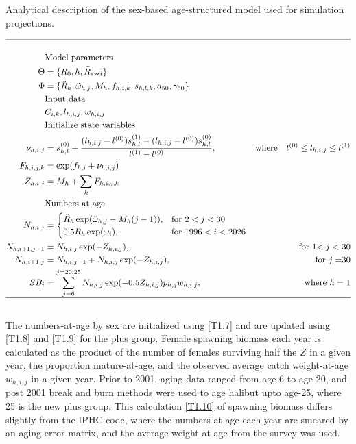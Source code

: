\begin{table}
	\caption{Analytical description of the sex-based age-structured model used for simulation projections.}
	\label{tab:model_description}
	\begin{center}
		\tableEq
		\begin{align}
			\hline \nonumber\\
			&\mbox{Model parameters} \nonumber\\
			\Theta &= \{R_0,h,\bar{R},\omega_{i}\}  \label{T1.1}\\
			\Phi   &= \{\ddot{R}_h,\ddot{\omega}_{h,j},M_h,f_{h,i,k},s_{h,l,k},a_{50},\gamma_{50}\}  \label{T1.2}\\
			&\mbox{Input data} \nonumber\\
			&C_{i,k}, l_{h,i,j},w_{h,i,j} \label{T1.3}\\
			&\mbox{Initialize state variables }\nonumber\\
			\nu_{h,i,j} &= s_{h,l}^{(0)}+ \frac{ (l_{h,i,j}-l^{(0)})s_{h,l}^{(1)} - (l_{h,i,j}-l^{(0)})s_{h,l}^{(0)} }
			{ l^{(1)}-l^{(0)} },& \mbox{where} \quad l^{(0)} \leq l_{h,i,j} \leq l^{(1)} \label{T1.4}\\
			F_{h,i,j,k} &= \exp(f_{h,i} + \nu_{h,i,j}) \label{T1.5}\\
			Z_{h,i,j} & = M_h + \sum_k F_{h,i,j,k} \label{T1.6} \\
			&\mbox{Numbers at age}\nonumber\\
			N_{h,i,j} &= 
			\begin{cases}
				\ddot{R}_{h}\exp(\ddot{\omega}_{h,j}-M_h (j-1)), & \mbox{for $2<j<30$}\\
				0.5 R_h\exp(\omega_{i}), & \mbox{for $1996<i<2026$}\\
			\end{cases} \label{T1.7}\\
			N_{h,i+1,j+1} &= N_{h,i,j} \exp(-Z_{h,i,j}), & \mbox{for 1$<j<$ 30}\label{T1.8}\\
			N_{h,i+1,j} &= N_{h,i,j-1}+N_{h,i,j} \exp(-Z_{h,i,j}) , & \mbox{for $j =$30}\label{T1.9}\\
			SB_{i} &= \sum_{j=6}^{j=20,25} N_{h,i,j}\exp(-0.5Z_{h,i,j}) p_{h,j} w_{h,i,j},& \mbox{where $h=1$}\label{T1.10}\\
			\hline \nonumber
		\end{align}
		\normalEq
	\end{center}
\end{table}

The numbers-at-age by sex are initialized using \eqref{T1.7} and are updated using \eqref{T1.8} and \eqref{T1.9} for the plus group.  Female spawning biomass each year is calculated as the product of the number of females surviving half the $Z$ in a given year, the proportion mature-at-age, and the observed average catch weight-at-age $w_{h,i,j}$ in a given year.  Prior to 2001, aging data ranged from age-6 to age-20, and post 2001 break and burn methods were used to age halibut upto age-25, where 25 is the new plus group.  This calculation \eqref{T1.10} of spawning biomass differs slightly from the IPHC code, where the numbers-at-age each year are smeared by an aging error matrix, and the average weight at age from the survey was used.

